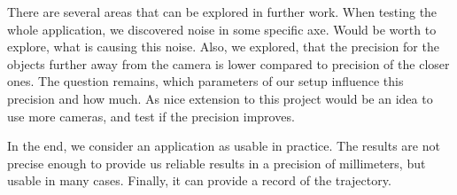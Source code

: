 There are several areas that can be explored in further work. When testing the
whole application, we discovered noise in some specific axe. Would be worth to
explore, what is causing this noise. Also, we explored, that the precision for
the objects further away from the camera is lower compared to precision of the
closer ones. The question remains, which parameters of our setup influence this
precision and how much. As nice extension to this project would be an idea to
use more cameras, and test if the precision improves.

In the end, we consider an application as usable in practice. The results are
not precise enough to provide us reliable results in a precision of
millimeters, but usable in many cases. Finally, it can provide a record of the
trajectory.
